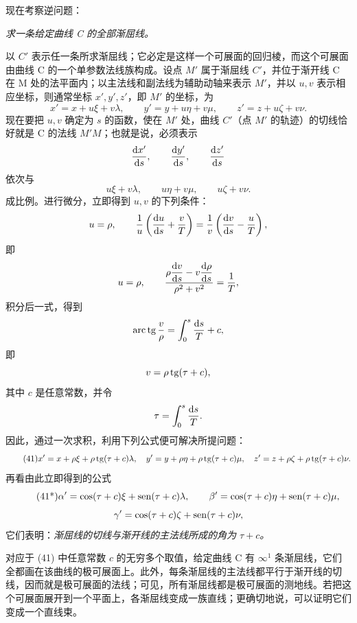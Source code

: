 现在考察逆问题：
\begin{center}
\emph{求一条给定曲线 C 的全部渐屈线。}
\end{center}
以 \(C'\) 表示任一条所求渐屈线；它必定是这样一个可展面的回归棱，而这个可展面由曲线 C 的一个单参数法线族构成。设点 \(M'\) 属于渐屈线 \(C'\)，并位于渐开线 C 在 M 处的法平面内；以主法线和副法线为辅助动轴来表示 \(M'\)，并以 \(u,v\) 表示相应坐标，则通常坐标 \(x',y',z'\)，即 \(M'\) 的坐标，为
\[
x'=x+u\xi+v\lambda,
\qquad
 y'=y+u\eta+v\mu,
\qquad
 z'=z+u\zeta+v\nu.
\]
现在要把 \(u,v\) 确定为 \(s\) 的函数，使在 \(M'\) 处，曲线 \(C'\)（点 \(M'\) 的轨迹）的切线恰好就是 C 的法线 \(M'M\)；也就是说，必须表示
\[
\frac{\mathrm{d} x'}{\mathrm{d} s},\qquad \frac{\mathrm{d} y'}{\mathrm{d} s},\qquad \frac{\mathrm{d} z'}{\mathrm{d} s}
\]
依次与
\[
u\xi+v\lambda,
\qquad
u\eta+v\mu,
\qquad
u\zeta+v\nu.
\]
成比例。进行微分，立即得到 \(u,v\) 的下列条件：
\[
u=\rho,
\qquad
\frac{1}{u}\left(\frac{\mathrm{d} u}{\mathrm{d} s}+\frac{v}{T}\right)=\frac{1}{v}\left(\frac{\mathrm{d} v}{\mathrm{d} s}-\frac{u}{T}\right),
\]
即
\[
u=\rho,
\qquad
\frac{\rho\dfrac{\mathrm{d} v}{\mathrm{d} s}-v\dfrac{\mathrm{d}\rho}{\mathrm{d} s}}{\rho^2+v^2}=\frac{1}{T},
\]
积分后一式，得到
\[
\operatorname{arc\,tg}\frac{v}{\rho}=\int_0^s\frac{\mathrm{d} s}{T}+c,
\]
即
\[
v=\rho\operatorname{tg}(\tau+c),
\]
其中 \(c\) 是任意常数，并令
\[
\tau=\int_0^s\frac{\mathrm{d} s}{T}.
\]
因此，通过一次求积，利用下列公式便可解决所提问题：
\begin{equation}\tag{41}
x'=x+\rho\xi+\rho\operatorname{tg}(\tau+c)\lambda,
\quad
 y'=y+\rho\eta+\rho\operatorname{tg}(\tau+c)\mu,
\quad
 z'=z+\rho\zeta+\rho\operatorname{tg}(\tau+c)\nu.
\end{equation}
再看由此立即得到的公式
\begin{equation}\tag{41*}
\alpha'=\cos(\tau+c)\xi+\operatorname{sen}(\tau+c)\lambda,
\qquad
\beta'=\cos(\tau+c)\eta+\operatorname{sen}(\tau+c)\mu,
\end{equation}
\[
\gamma'=\cos(\tau+c)\zeta+\operatorname{sen}(\tau+c)\nu,
\]
它们表明：\emph{渐屈线的切线与渐开线的主法线所成的角为 \(\tau+c\)。}

对应于 (41) 中任意常数 \(c\) 的无穷多个取值，给定曲线 C 有 \(\infty^1\) 条渐屈线，它们全都画在该曲线的极可展面上。此外，每条渐屈线的主法线都平行于渐开线的切线，因而就是极可展面的法线；可见，所有渐屈线都是极可展面的测地线。若把这个可展面展开到一个平面上，各渐屈线变成一族直线；更确切地说，可以证明它们变成一个直线束。


